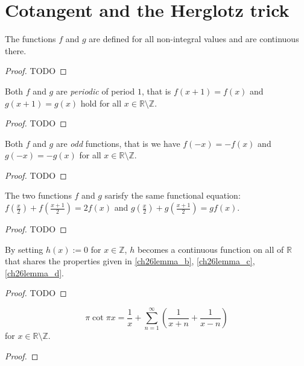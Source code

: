 \chapter{Cotangent and the Herglotz trick}

\begin{lemma}[A]
  \label{ch26lemma_a}
  The functions $f$ and $g$ are defined for all non-integral values and are continuous there.
\end{lemma}
\begin{proof}
  TODO
\end{proof}

\begin{lemma}[B]
  \label{ch26lemma_b}
  Both $f$ and $g$ are \emph{periodic} of period $1$, that is $f(x + 1) = f(x)$ and
  $g(x + 1) = g(x)$ hold for all $x\in \mathbb{R}\setminus\mathbb{Z}$.
\end{lemma}
\begin{proof}
  TODO
\end{proof}

\begin{lemma}[C]
  \label{ch26lemma_c}
  Both $f$ and $g$ are \emph{odd} functions, that is we have $f(-x) = -f(x)$ and
  $g(-x) = -g(x)$ for all $x\in \mathbb{R}\setminus\mathbb{Z}$.
\end{lemma}
\begin{proof}
  TODO
\end{proof}


\begin{lemma}[D]
  \label{ch26lemma_d}
  The two functions $f$ and $g$ sarisfy the same functional equation:
  $f(\frac{x}{2}) + f(\frac{x + 1}{2}) = 2f(x)$ and
  $g(\frac{x}{2}) + g(\frac{x + 1}{2}) = gf(x)$.
\end{lemma}
\begin{proof}
  TODO
\end{proof}

\begin{lemma}[E]
  \label{ch26lemma_e}
  By setting $h(x) := 0$ for $x \in \mathbb{Z}$, $h$ becomes a continuous function
  on all of $\mathbb{R}$ that shares the properties given in
  \ref{ch26lemma_b}, \ref{ch26lemma_c}, \ref{ch26lemma_d}.
\end{lemma}
\begin{proof}
  TODO
\end{proof}

\begin{theorem}
  \label{ch26}
  \[
  \pi\cot{\pi x} = \frac{1}{x} + \sum_{n = 1}^\infty \left(\frac{1}{x + n} + \frac{1}{x - n}\right)
  \]
  for $x\in \mathbb{R}\setminus\mathbb{Z}$.
\end{theorem}
\begin{proof}
\end{proof}
